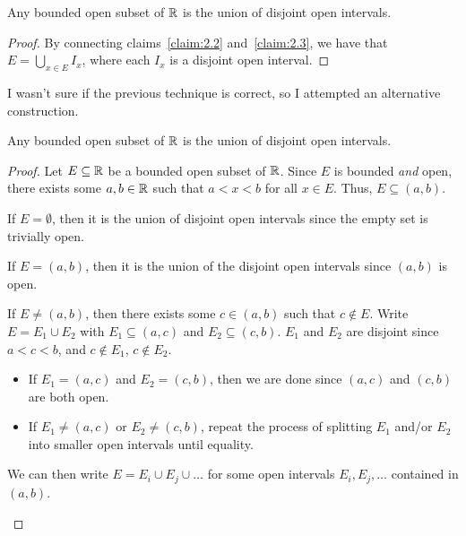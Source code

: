 \begin{answer}
\begin{claim}
  \end{claim}

  \begin{claim}
    Any bounded open subset of $\mathbb{R}$ is the union of disjoint open intervals.

    \begin{proof}
      By connecting claims~\ref{claim:2.2} and~\ref{claim:2.3},
      we have that $E = \bigcup\limits_{x \in E} I_x$,
      where each $I_x$ is a disjoint open interval.
    \end{proof}
  \end{claim}
\end{answer}


\newpage
I wasn't sure if the previous technique is correct,
so I attempted an alternative construction.

\begin{answer}
  \begin{claim}
    Any bounded open subset of $\mathbb{R}$ is the union of disjoint open intervals.

    \begin{proof}
      Let $E \subseteq \mathbb{R}$ be a bounded open subset of $\mathbb{R}$.
      Since $E$ is bounded \emph{and} open, there exists some $a, b \in \mathbb{R}$ such that
      $a < x < b$ for all $x \in E$.
      Thus, $E \subseteq (a, b)$.
    
      \begin{enumroman}
        \item If $E = \emptyset$, then it is the union of disjoint open intervals
          since the empty set is trivially open.
        \item If $E = (a, b)$, then it is the union of the disjoint open intervals
          since $(a, b)$ is open.
        \item If $E \neq (a, b)$, then there exists some $c \in (a, b)$ such that
          $c \not \in E$. Write $E = E_1 \cup E_2$ with $E_1 \subseteq (a, c)$
          and $E_2 \subseteq (c, b)$.
          $E_1$ and $E_2$ are disjoint since $a < c < b$, and $c \not \in E_1$,
          $c \not \in E_2$.
          \begin{itemize}
            \item If $E_1 = (a, c)$ and $E_2 = (c, b)$, then we are done
              since $(a, c)$ and $(c, b)$ are both open.
            \item If $E_1 \neq (a, c)$ or $E_2 \neq (c, b)$,
              repeat the process of splitting $E_1$ and/or $E_2$ into smaller open intervals
              until equality.
          \end{itemize}
          We can then write $E = E_i \cup E_j \cup \dots$ for some
          open intervals $E_i, E_j, \dots$ contained in $(a, b)$.
      \end{enumroman}
    \end{proof}
  \end{claim}
\end{answer}
